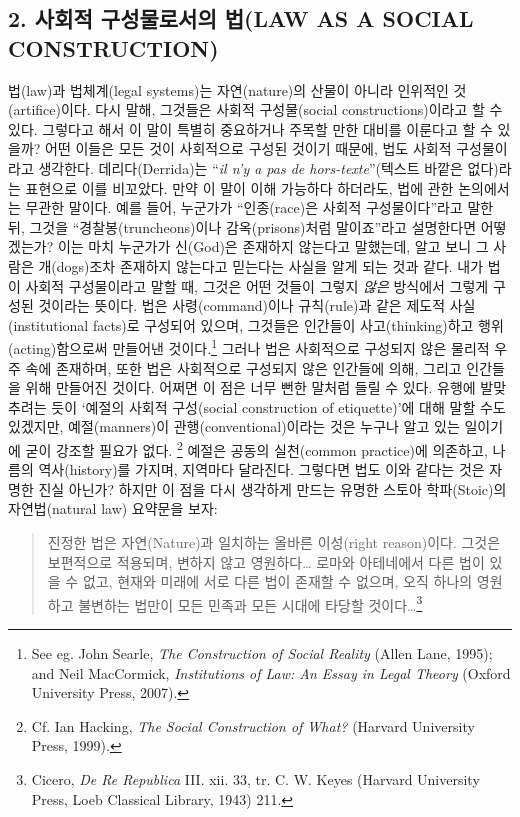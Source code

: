 \documentclass[12pt, oneside]{book}  %
\begin{document}
\subsection{\texorpdfstring{\textbf{2. 사회적 구성물로서의 법(LAW AS A
SOCIAL
CONSTRUCTION)}}{2. 사회적 구성물로서의 법(LAW AS A SOCIAL CONSTRUCTION)}}\label{uxc0acuxd68cuxc801-uxad6cuxc131uxbb3cuxb85cuxc11cuxc758-uxbc95law-as-a-social-construction}

법(law)과 법체계(legal systems)는 자연(nature)의 산물이 아니라 인위적인
것(artifice)이다. 다시 말해, 그것들은 사회적 구성물(social
constructions)이라고 할 수 있다. 그렇다고 해서 이 말이 특별히 중요하거나
주목할 만한 대비를 이룬다고 할 수 있을까? 어떤 이들은 모든 것이
사회적으로 구성된 것이기 때문에, 법도 사회적 구성물이라고 생각한다.
데리다(Derrida)는 ``\emph{il n'y a pas de hors-texte}''(텍스트 바깥은
없다)라는 표현으로 이를 비꼬았다. 만약 이 말이 이해 가능하다 하더라도,
법에 관한 논의에서는 무관한 말이다. 예를 들어, 누군가가 ``인종(race)은
사회적 구성물이다''라고 말한 뒤, 그것을 ``경찰봉(truncheons)이나
감옥(prisons)처럼 말이죠''라고 설명한다면 어떻겠는가? 이는 마치 누군가가
신(God)은 존재하지 않는다고 말했는데, 알고 보니 그 사람은 개(dogs)조차
존재하지 않는다고 믿는다는 사실을 알게 되는 것과 같다. 내가 법이 사회적
구성물이라고 말할 때, 그것은 어떤 것들이 그렇지 \emph{않은} 방식에서
그렇게 구성된 것이라는 뜻이다. 법은 사령(command)이나 규칙(rule)과 같은
제도적 사실(institutional facts)로 구성되어 있으며, 그것들은 인간들이
사고(thinking)하고 행위(acting)함으로써 만들어낸 것이다.\footnote{See
  eg. John Searle, \emph{The Construction of Social Reality} (Allen
  Lane, 1995); and Neil MacCormick, \emph{Institutions of Law: An Essay
  in Legal Theory} (Oxford University Press, 2007).} 그러나 법은
사회적으로 구성되지 않은 물리적 우주 속에 존재하며, 또한 법은 사회적으로
구성되지 않은 인간들에 의해, 그리고 인간들을 위해 만들어진 것이다.
어쩌면 이 점은 너무 뻔한 말처럼 들릴 수 있다. 유행에 발맞추려는 듯이
`예절의 사회적 구성(social construction of etiquette)'에 대해 말할 수도
있겠지만, 예절(manners)이 관행(conventional)이라는 것은 누구나 알고 있는
일이기에 굳이 강조할 필요가 없다. \footnote{Cf. Ian Hacking, \emph{The
  Social Construction of What?} (Harvard University Press, 1999).}
예절은 공동의 실천(common practice)에 의존하고, 나름의 역사(history)를
가지며, 지역마다 달라진다. 그렇다면 법도 이와 같다는 것은 자명한 진실
아닌가? 하지만 이 점을 다시 생각하게 만드는 유명한 스토아 학파(Stoic)의
자연법(natural law) 요약문을 보자:

\begin{quote}
진정한 법은 자연(Nature)과 일치하는 올바른 이성(right reason)이다.
그것은 보편적으로 적용되며, 변하지 않고 영원하다\ldots{} 로마와
아테네에서 다른 법이 있을 수 없고, 현재와 미래에 서로 다른 법이 존재할
수 없으며, 오직 하나의 영원하고 불변하는 법만이 모든 민족과 모든 시대에
타당할 것이다\ldots{}\footnote{Cicero, \emph{De Re Republica} III. xii.
  33, tr. C. W. Keyes (Harvard University Press, Loeb Classical Library,
  1943) 211.}
\end{quote}
\end{document}
